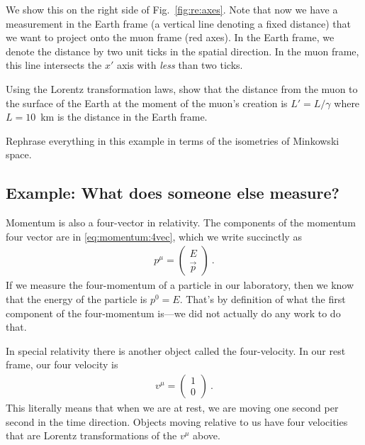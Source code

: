 \documentclass[12pt]{article}
\begin{document}
We show this on the right side of Fig.~\ref{fig:re:axes}. Note that now we have a measurement in the Earth frame (a vertical line denoting a fixed distance) that we want to project onto the muon frame (red axes). In the Earth frame, we denote the distance by two unit ticks in the spatial direction. In the muon frame, this line intersects the $x'$ axis with \emph{less} than two ticks.

\begin{exercise}
Using the Lorentz transformation laws, show that the distance from the muon to the surface of the Earth at the moment of the muon's creation is $L'=L/\gamma$ where $L=10$~km is the distance in the Earth frame. 
\end{exercise}

\begin{exercise}
Rephrase everything in this example in terms of the isometries of Minkowski space. 
\end{exercise}

\subsection{Example: What does someone else measure?}

Momentum is also a four-vector in relativity. The components of the momentum four vector are in \eqref{eq:momentum:4vec}, which we write succinctly as
\begin{align}
    p^\mu = 
    \begin{pmatrix}
        E \\ \vec{p}
    \end{pmatrix} \ .
\end{align}
If we measure the four-momentum of a particle in our laboratory, then we know that the energy of the particle is $p^0 = E$. That's by definition of what the first component of the four-momentum is---we did not actually do any work to do that. 

In special relativity there is another object called the four-velocity. In our rest frame, our four velocity is
\begin{align}
    v^\mu = \begin{pmatrix}
        1\\ 0
    \end{pmatrix} \ .
    \label{eq:4:velocity:in:rest:Frame}
\end{align}
This literally means that when we are at rest, we are moving one second per second in the time direction. Objects moving relative to us have four velocities that are Lorentz transformations of the $v^\mu$ above. 
\end{document}
